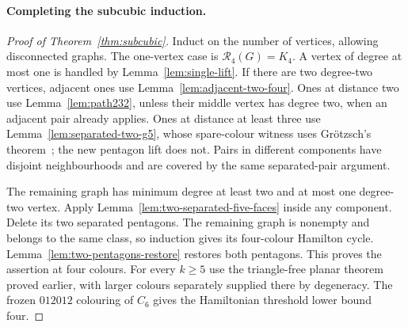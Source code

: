 \documentclass[11pt]{article}
\theoremstyle{remark}
\newcommand{\R}{\mathcal R}
\numberwithin{equation}{section}
\numberwithin{table}{section}
\begin{document}
\paragraph{Completing the subcubic induction.}
\begin{proof}[Proof of Theorem~\ref{thm:subcubic}]
Induct on the number of vertices, allowing disconnected graphs.
The one-vertex case is $\R_4(G)=K_4$. A vertex of degree at most one
is handled by Lemma~\ref{lem:single-lift}.
If there are two degree-two vertices, adjacent ones use Lemma~\ref{lem:adjacent-two-four}. Ones at distance two use Lemma~\ref{lem:path232}, unless their
middle vertex has degree two, when an adjacent pair already applies.
Ones at distance at least three use Lemma~\ref{lem:separated-two-g5}, whose spare-colour witness uses
Gr\"otzsch's theorem~\cite{Grotzsch59}; the new pentagon lift does not.
Pairs in different components have disjoint neighbourhoods and
are covered by the same separated-pair argument.

The remaining graph has minimum degree at least two and at most
one degree-two vertex. Apply Lemma~\ref{lem:two-separated-five-faces}
inside any component. Delete its two separated pentagons.
The remaining graph is nonempty and belongs to the same class, so
induction gives its four-colour Hamilton cycle.
Lemma~\ref{lem:two-pentagons-restore} restores both pentagons.
This proves the assertion at four colours.
For every $k\ge5$ use the triangle-free planar theorem proved earlier,
with larger colours separately supplied there by degeneracy.
The frozen $012012$ colouring of $C_6$ gives the Hamiltonian
threshold lower bound four.
\end{proof}
\end{document}
